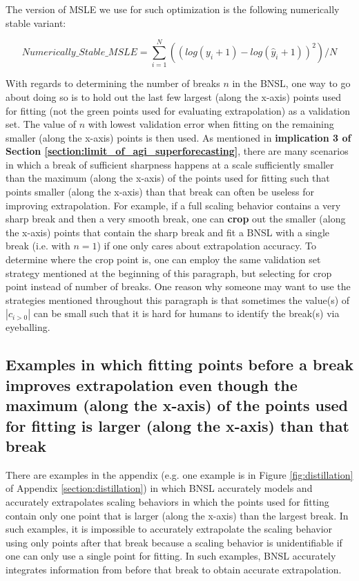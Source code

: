 \documentclass{article} %
\begin{document}
The version of MSLE we use for such optimization is the following numerically stable variant:

\[Numerically\_Stable\_MSLE = \sum_{i=1}^{N} ((log(y_{i}+1)-log(\hat{y}_{i}+1))^2)/N\] 

With regards to determining the number of breaks $n$ in the BNSL, one way to go about doing so is to hold out the last few largest (along the x-axis) points used for fitting (not the green points used for evaluating extrapolation) as a validation set. The value of $n$ with lowest validation error when fitting on the remaining smaller (along the x-axis) points is then used. As mentioned in \textbf{implication 3 of Section \ref{section:limit_of_agi_superforecasting}}, there are many scenarios in which a break of sufficient sharpness happens at a scale sufficiently smaller than the maximum (along the x-axis) of the points used for fitting such that points smaller (along the x-axis) than that break can often be useless for improving extrapolation. For example, if a full scaling behavior contains a very sharp break and then a very smooth break, one can \textbf{crop} out the smaller (along the x-axis) points that contain the sharp break and fit a BNSL with a single break (i.e. with $n=1$) if one only cares about extrapolation accuracy. To determine where the crop point is, one can employ the same validation set strategy mentioned at the beginning of this paragraph, but selecting for crop point instead of number of breaks. One reason why someone may want to use the strategies mentioned throughout this paragraph is that sometimes the value(s) of $|c_{i>0}|$ can be small such that it is hard for humans to identify the break(s) via eyeballing.

\subsection{Examples in which fitting points before a break improves extrapolation even though the maximum (along the x-axis) of the points used for fitting is larger (along the x-axis) than that break}
\label{section:fitting_before_break_is_useful}

There are examples in the appendix (e.g. one example is in Figure \ref{fig:distillation} of Appendix \ref{section:distillation}) in which BNSL accurately models and accurately extrapolates scaling behaviors in which the points used for fitting contain only one point that is larger (along the x-axis) than the largest break. In such examples, it is impossible to accurately extrapolate the scaling behavior using only points after that break because a scaling behavior is unidentifiable if one can only use a single point for fitting. In such examples, BNSL accurately integrates information from before that break to obtain accurate extrapolation.
\end{document}
